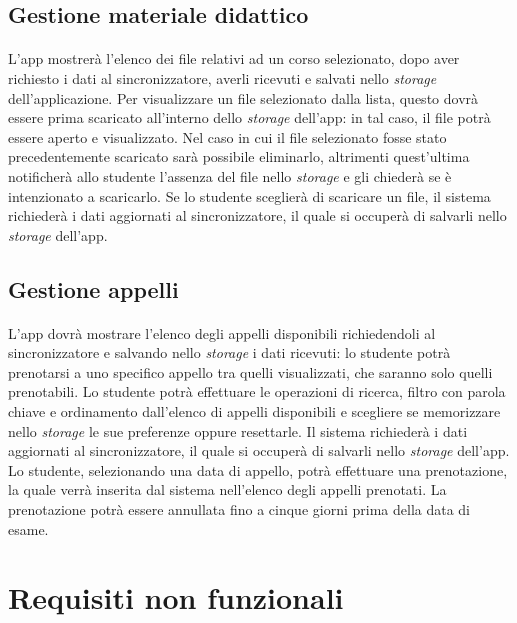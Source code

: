 \subsection{Gestione materiale didattico}
\paragraph{} 
L’app mostrerà l’elenco dei file relativi ad un corso selezionato, dopo aver richiesto i dati al sincronizzatore, averli ricevuti e salvati nello \textit{storage} dell’applicazione. Per visualizzare un file selezionato dalla lista, questo dovrà essere prima scaricato all’interno dello \textit{storage} dell’app: in tal caso, il file potrà essere aperto e visualizzato. Nel caso in cui il file selezionato fosse stato precedentemente scaricato sarà possibile eliminarlo, altrimenti quest’ultima notificherà allo studente l’assenza del file nello \textit{storage} e gli chiederà se è intenzionato a scaricarlo. Se lo studente sceglierà di scaricare un file, il sistema richiederà i dati aggiornati al sincronizzatore, il quale si occuperà di salvarli nello \textit{storage} dell’app.
\subsection{Gestione appelli}
\paragraph{} 
L’app dovrà mostrare l’elenco degli appelli disponibili richiedendoli al sincronizzatore e salvando nello \textit{storage} i dati ricevuti: lo studente potrà prenotarsi a uno specifico appello tra quelli visualizzati, che saranno solo quelli prenotabili. Lo studente potrà effettuare le operazioni di ricerca, filtro con parola chiave e ordinamento dall'elenco di appelli disponibili e scegliere se memorizzare nello \textit{storage} le sue preferenze oppure resettarle. Il sistema richiederà i dati aggiornati al sincronizzatore, il quale si occuperà di salvarli nello \textit{storage} dell’app. Lo studente, selezionando una data di appello, potrà effettuare una prenotazione, la quale verrà inserita dal sistema nell’elenco degli appelli prenotati. La prenotazione potrà essere annullata fino a cinque giorni prima della data di esame.


\newpage
\section{Requisiti non funzionali}

